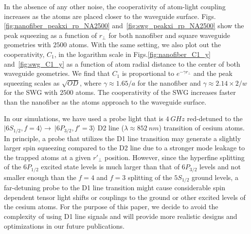 \documentclass[preprint,aps,pra,onecolumn,superscriptaddress]{revtex4-1} %
\def\ket#1{\lvert{#1}\rangle}%
\begin{document}
{\color{red} In the absence of any other noise, the cooperativity of atom-light coupling increases as the atoms are placed closer to the waveguide surface. Figs.\ref{fig:nanofiber_peakxi_rp_NA2500} and~\ref{fig:swg_peakxi_rp_NA2500} show the peak squeezing  as a function of $ r\!_\perp $ for both nanofiber and square waveguide geometries with $2500$ atoms. With the same setting, we also plot out the cooperativity, $ C_1 $, in the logarithm scale in Figs.\ref{fig:nanofiber_C1_y} and~\ref{fig:swg_C1_y} as a function of atom radial distance to the center of both waveguide geometries. We find that $C_1$ is proportional to $ e^{-\gamma r\!_\perp} $ and the peak squeezing scales as $ \sqrt{OD} $, where $ \gamma\approx 1.65/a $ for the nanofiber and $ \gamma\approx 2.14\times 2/w $ for the SWG with $2500$ atoms. The cooperativity of the SWG increases faster than the nanofiber as the atoms approach to the waveguide surface. 

In our simulations, we have used a probe light that is $\SI{4}{GHz}$ red-detuned to the $\ket{6S_{1/2}, f=4}\rightarrow \ \ket{6P_{3/2},f'=3}$ D2 line ($ \lambda\approx \SI{852}{nm} $) transition of cesium atoms. In principle, a probe that utilizes the D1 line transition may generate a slightly larger spin squeezing compared to the D2 line due to a stronger mode leakage to the trapped atoms at a given $ r'_\perp $ position. However, since the hyperfine splitting of the $ 6P_{1/2} $ excited state levels is much larger than that of $ 6P_{3/2} $ levels and not smaller enough than the $ f=4 $ and $ f=3 $ splitting of the $ 5S_{1/2} $ ground levels, a far-detuning probe to the D1 line transition might cause considerable spin dependent tensor light shifts or couplings to the ground or other excited levels of the cesium atoms. For the purpose of this paper, we decide to avoid the complexity of using D1 line signals and will provide more realistic designs and optimizations in our future publications. }
\end{document}
